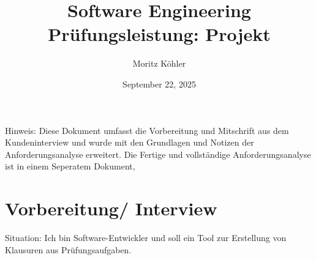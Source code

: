 \documentclass[a4paper]{article}
\title{Software Engineering \\ \large Prüfungsleistung: Projekt}
\author{Moritz Köhler}
\date{September 22, 2025}
\begin{document}
\maketitle
\tableofcontents

Hinweis: Diese Dokument umfasst die Vorbereitung und Mitschrift aus dem Kundeninterview und wurde mit den Grundlagen und Notizen der Anforderungsanalyse erweitert. Die Fertige und vollständige Anforderungsanalyse ist in einem Seperatem Dokument,

\pagebreak

\section{Vorbereitung/ Interview}

Situation: Ich bin Software-Entwickler und soll ein Tool zur Erstellung von Klausuren aus Prüfungsaufgaben.
\end{document}

